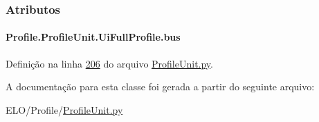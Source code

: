 \subsubsection{Atributos}
\hypertarget{classProfile_1_1ProfileUnit_1_1UiFullProfile_a47049f3f61c7fada93dd84fccd19a2bd}{
\paragraph[{bus}]{\setlength{\rightskip}{0pt plus 5cm}Profile.\-Profile\-Unit.\-Ui\-Full\-Profile.\-bus}}\label{classProfile_1_1ProfileUnit_1_1UiFullProfile_a47049f3f61c7fada93dd84fccd19a2bd}


Definição na linha \hyperlink{ProfileUnit_8py_source_l00206}{206} do arquivo \hyperlink{ProfileUnit_8py_source}{Profile\-Unit.\-py}.



A documentação para esta classe foi gerada a partir do seguinte arquivo\-:\begin{DoxyCompactItemize}
\item 
E\-L\-O/\-Profile/\hyperlink{ProfileUnit_8py}{Profile\-Unit.\-py}\end{DoxyCompactItemize}

